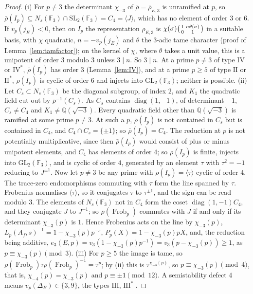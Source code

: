 \documentclass[11pt]{amsart}
\theoremstyle{definition}
\newcommand{\Q}{\mathbb{Q}}
\newcommand{\F}{\mathbb{F}}
\newcommand{\Frob}{\operatorname{Frob}}
\newcommand{\SL}{\mathrm{SL}}
\newcommand{\GL}{\mathrm{GL}}
\begin{document}
\begin{proof}
(i) For $p\ne3$ the determinant $\chi_{-3}$ of $\bar\rho=\bar\rho_{E,3}$ is unramified at $p$, so $\bar\rho(I_p)\subseteq N_s(\F_3)\cap\SL_2(\F_3)=C_4=\langle J\rangle$, which has no element of order $3$ or $6$. If $v_p(j_E)<0$, then on $I_p$ the representation $\rho_{E,3}$ is $\chi(\sigma)\begin{psmallmatrix}1&n\theta(\sigma)\\0&1\end{psmallmatrix}$ in a suitable basis, with $\chi$ quadratic, $n=-v_p(j_E)$ and $\theta$ the $3$-adic tame character (proof of Lemma~\ref{lem:tamfactor}); on the kernel of $\chi$, where $\theta$ takes a unit value, this is a unipotent of order $3$ modulo $3$ unless $3\mid n$. So $3\mid n$. At a prime $p\ne3$ of type $\mathrm{IV}$ or $\mathrm{IV}^*$, $\bar\rho(I_p)$ has order $3$ (Lemma~\ref{lem:IV}), and at a prime $p\ge5$ of type $\mathrm{II}$ or $\mathrm{II}^*$, $\rho(I_p)$ is cyclic of order $6$ \cite{Kraus90} and injects into $\GL_2(\F_3)$; neither is possible. (ii) Let $C_s\subset N_s(\F_3)$ be the diagonal subgroup, of index $2$, and $K_1$ the quadratic field cut out by $\bar\rho^{-1}(C_s)$. As $C_s$ contains $\operatorname{diag}(1,-1)$, of determinant $-1$, $C_s\ne C_4$ and $K_1\ne\Q(\sqrt{-3})$. Every quadratic field other than $\Q(\sqrt{-3})$ is ramified at some prime $p\ne3$. At such a $p$, $\bar\rho(I_p)$ is not contained in $C_s$ but is contained in $C_4$, and $C_4\cap C_s=\{\pm1\}$; so $\bar\rho(I_p)=C_4$. The reduction at $p$ is not potentially multiplicative, since then $\bar\rho(I_p)$ would consist of plus or minus unipotent elements, and $C_4$ has elements of order $4$; so $\rho(I_p)$ is finite, injects into $\GL_2(\F_3)$, and is cyclic of order $4$, generated by an element $\tau$ with $\tau^2=-1$ reducing to $J^{\pm1}$. Now let $p\ne3$ be any prime with $\rho(I_p)=\langle\tau\rangle$ cyclic of order $4$. The trace-zero endomorphisms commuting with $\tau$ form the line spanned by $\tau$. Frobenius normalises $\langle\tau\rangle$, so it conjugates $\tau$ to $\tau^{\pm1}$, and the sign can be read modulo $3$. The elements of $N_s(\F_3)$ not in $C_4$ form the coset $\operatorname{diag}(1,-1)C_4$, and they conjugate $J$ to $J^{-1}$; so $\bar\rho(\Frob_p)$ commutes with $J$ if and only if its determinant $\chi_{-3}(p)$ is $1$. Hence Frobenius acts on the line by $\chi_{-3}(p)$, $L_p(A_f,s)^{-1}=1-\chi_{-3}(p)p^{-s}$, $P_p(X)=1-\chi_{-3}(p)pX$, and, the reduction being additive, $e_3(E,p)=v_3(1-\chi_{-3}(p)p^{-1})=v_3(p-\chi_{-3}(p))\ge1$, as $p\equiv\chi_{-3}(p)\pmod3$. (iii) For $p\ge5$ the image is tame, so $\rho(\Frob_p)\tau\rho(\Frob_p)^{-1}=\tau^p$; by (ii) this is $\tau^{\chi_{-3}(p)}$, so $p\equiv\chi_{-3}(p)\pmod4$, that is, $\chi_{-4}(p)=\chi_{-3}(p)$ and $p\equiv\pm1\pmod{12}$. A semistability defect $4$ means $v_p(\Delta_E)\in\{3,9\}$, the types $\mathrm{III}$, $\mathrm{III}^*$ \cite{Kraus90}.
\end{proof}
\end{document}

